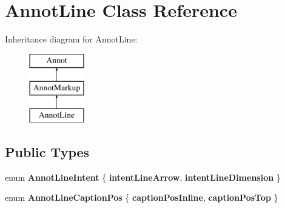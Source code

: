 \hypertarget{class_annot_line}{}\section{Annot\+Line Class Reference}
\label{class_annot_line}
Inheritance diagram for Annot\+Line\+:\begin{figure}[H]
\begin{center}
\leavevmode
\includegraphics[height=3.000000cm]{class_annot_line}
\end{center}
\end{figure}
\subsection*{Public Types}
\begin{DoxyCompactItemize}
\item 
\mbox{\label{class_annot_line_a0e5291844a52c7379dad18a2ff56ad0c}} 
enum {\bfseries Annot\+Line\+Intent} \{ {\bfseries intent\+Line\+Arrow}, 
{\bfseries intent\+Line\+Dimension}
 \}
\item 
\mbox{\label{class_annot_line_a214239d5a866f21a6a24e32e5178e796}} 
enum {\bfseries Annot\+Line\+Caption\+Pos} \{ {\bfseries caption\+Pos\+Inline}, 
{\bfseries caption\+Pos\+Top}
 \}
\end{DoxyCompactItemize}
